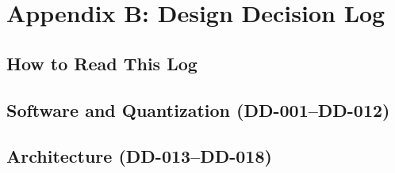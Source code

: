 %
%
%
\chapter*{Appendix B: Design Decision Log}
\label{appendix:decisions}

\section{How to Read This Log}
\label{sec:decisions-intro}

\section{Software and Quantization (DD-001--DD-012)}
\label{sec:decisions-sw}

\section{Architecture (DD-013--DD-018)}
\label{sec:decisions-arch}

